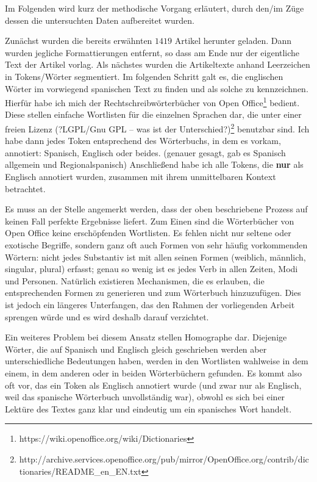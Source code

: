 Im Folgenden wird kurz der methodische Vorgang erläutert, durch den/im Züge dessen die untersuchten Daten aufbereitet wurden.

Zunächst wurden die bereits erwähnten $1419$ Artikel herunter geladen.
Dann wurden jegliche Formattierungen entfernt, so dass am Ende nur der eigentliche Text der Artikel vorlag.
Als nächstes wurden die Artikeltexte anhand Leerzeichen in Tokens/Wörter segmentiert.
Im folgenden Schritt galt es, die englischen Wörter im vorwiegend spanischen Text zu finden und als solche zu kennzeichnen.
Hierfür habe ich mich der Rechtschreibwörterbücher von Open Office\footnote{https://wiki.openoffice.org/wiki/Dictionaries} bedient.
Diese stellen einfache Wortlisten für die einzelnen Sprachen dar, die unter einer freien Lizenz (?LGPL/Gnu GPL -- was ist der Unterschied?)\footnote{http://archive.services.openoffice.org/pub/mirror/OpenOffice.org/contrib/dictionaries/README\_en\_EN.txt} benutzbar sind.
Ich habe dann jedes Token entsprechend des Wörterbuchs, in dem es vorkam, annotiert: Spanisch, Englisch oder beides. (genauer gesagt, gab es Spanisch allgemein und Regionalspanisch)
Anschließend habe ich alle Tokens, die \textbf{nur} als Englisch annotiert wurden, zusammen mit ihrem unmittelbaren Kontext betrachtet.

Es muss an der Stelle angemerkt werden, dass der oben beschriebene Prozess auf keinen Fall perfekte Ergebnisse liefert.
Zum Einen sind die Wörterbücher von Open Office keine erschöpfenden Wortlisten.
Es fehlen nicht nur seltene oder exotische Begriffe, sondern ganz oft auch Formen von sehr häufig vorkommenden Wörtern:
nicht jedes Substantiv ist mit allen seinen Formen (weiblich, männlich, singular, plural) erfasst;
genau so wenig ist es jedes Verb in allen Zeiten, Modi und Personen.
Natürlich existieren Mechanismen, die es erlauben, die entsprechenden Formen zu generieren und zum Wörterbuch hinzuzufügen.
Dies ist jedoch ein längeres Unterfangen, das den Rahmen der vorliegenden Arbeit sprengen würde und es wird deshalb darauf verzichtet.

Ein weiteres Problem bei diesem Ansatz stellen Homographe dar.
Diejenige Wörter, die auf Spanisch und Englisch gleich geschrieben werden aber unterschiedliche Bedeutungen haben, werden in den Wortlisten wahlweise in dem einem, in dem anderen oder in beiden Wörterbüchern gefunden.
Es kommt also oft vor, das ein Token als Englisch annotiert wurde (und zwar nur als Englisch, weil das spanische Wörterbuch unvollständig war), obwohl es sich bei einer Lektüre des Textes ganz klar und eindeutig um ein spanisches Wort handelt.

